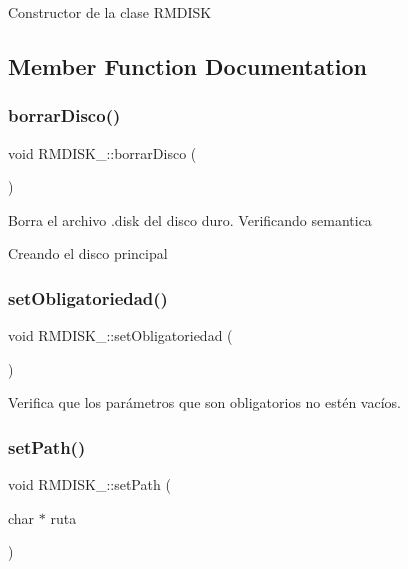 Constructor de la clase R\+M\+D\+I\+SK 

\subsection{Member Function Documentation}
\mbox{\label{classRMDISK___a49d4ed7ede3b344f5be86dd411314d34}} 
\subsubsection{\texorpdfstring{borrar\+Disco()}{borrarDisco()}}
{\footnotesize\ttfamily void R\+M\+D\+I\+S\+K\+\_\+\+::borrar\+Disco (\begin{DoxyParamCaption}{ }\end{DoxyParamCaption})}

Borra el archivo .disk del disco duro. Verificando semantica

Creando el disco principal \mbox{\label{classRMDISK___afe9e2e1e4ab06f37188e78fa5ce2e83b}} 
\subsubsection{\texorpdfstring{set\+Obligatoriedad()}{setObligatoriedad()}}
{\footnotesize\ttfamily void R\+M\+D\+I\+S\+K\+\_\+\+::set\+Obligatoriedad (\begin{DoxyParamCaption}{ }\end{DoxyParamCaption})}

Verifica que los parámetros que son obligatorios no estén vacíos. \mbox{\label{classRMDISK___a0aca679d77aa2cef1a72568693814eb8}} 
\subsubsection{\texorpdfstring{set\+Path()}{setPath()}}
{\footnotesize\ttfamily void R\+M\+D\+I\+S\+K\+\_\+\+::set\+Path (\begin{DoxyParamCaption}\item[{char $\ast$}]{ruta }\end{DoxyParamCaption})}

